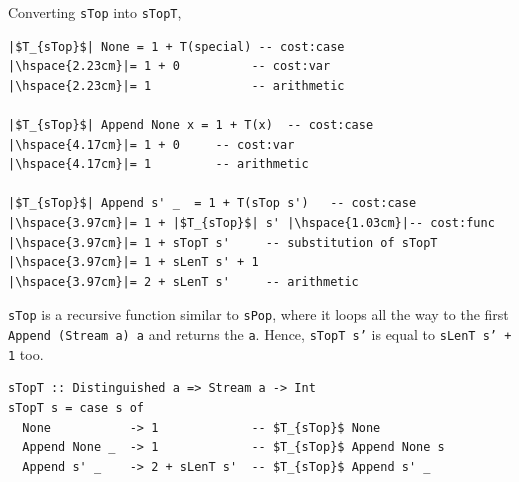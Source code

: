 \documentclass[12pt]{article}
\newcommand{\haskell}{\texttt}
\begin{document}
Converting \haskell{sTop} into \haskell{sTopT},
\begin{mdframed}
\begin{verbatim}
|$T_{sTop}$| None = 1 + T(special) -- cost:case
|\hspace{2.23cm}|= 1 + 0          -- cost:var
|\hspace{2.23cm}|= 1              -- arithmetic

|$T_{sTop}$| Append None x = 1 + T(x)  -- cost:case
|\hspace{4.17cm}|= 1 + 0     -- cost:var
|\hspace{4.17cm}|= 1         -- arithmetic

|$T_{sTop}$| Append s' _  = 1 + T(sTop s')   -- cost:case
|\hspace{3.97cm}|= 1 + |$T_{sTop}$| s' |\hspace{1.03cm}|-- cost:func
|\hspace{3.97cm}|= 1 + sTopT s'     -- substitution of sTopT
|\hspace{3.97cm}|= 1 + sLenT s' + 1
|\hspace{3.97cm}|= 2 + sLenT s'     -- arithmetic
\end{verbatim}

\par\noindent \haskell{sTop} is a recursive function similar to \haskell{sPop}, where it loops all the way to the first \haskell{Append (Stream a) a} and returns the \haskell{a}. Hence, \haskell{sTopT s'} is equal to \haskell{sLenT s' + 1} too.

\begin{verbatim}
sTopT :: Distinguished a => Stream a -> Int
sTopT s = case s of
  None           -> 1             -- $T_{sTop}$ None  
  Append None _  -> 1             -- $T_{sTop}$ Append None s
  Append s' _    -> 2 + sLenT s'  -- $T_{sTop}$ Append s' _
\end{verbatim}
\end{mdframed}
\end{document}
